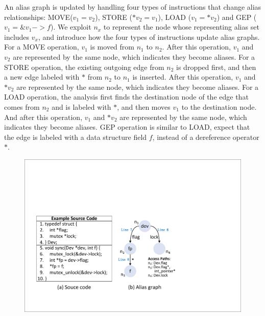 An alias graph is updated by handling four types of instructions that  
change alias relationships: MOVE($\mathit{v_1 = v_2}$), STORE ($\mathit{*v_2 = 
v_1}$), LOAD ($\mathit{v_1 = *v_2}$) and GEP ({$\mathit{v_1 = \&v_1->f}$}). We 
exploit {$\mathit{n_x}$} to represent the node whose representing alias set 
includes $\mathit{v_x}$, and introduce how the four types of instructions 
update alias graphs. For a MOVE operation, $\mathit{v_1}$ is moved from 
$\mathit{n_1}$ to $\mathit{n_2}$. After this operation, $\mathit{v_1}$ and  
$\mathit{v_2}$ are represented by the same node, which indicates they become 
aliases. For a STORE operation, the existing outgoing edge from $\mathit{n_2}$ 
is dropped first, and then a new edge labeled with $\mathit{*}$ from 
$\mathit{n_2}$ to $\mathit{n_1}$ is inserted. After this operation, 
$\mathit{v_1}$ and $\mathit{*v_2}$ are represented by the same node, which 
indicates they become aliases. For a LOAD operation, the analysis first finds 
the destination node of the edge that comes from $\mathit{n_2}$ and is labeled 
with $\mathit{*}$, and then moves $\mathit{v_1}$ to the destination node. And 
after this operation, $\mathit{v_1}$ and $\mathit{*v_2}$ are represented by the 
same node, which indicates they become aliases. GEP operation is similar to 
LOAD, expect that the edge is labeled with a data structure field $\mathit{f}$, 
instead of a dereference operator $\mathit{*}$.

\begin{figure}[htbp]
	\centering
	\includegraphics[width=0.9\linewidth]{figures/fig_demo_alias_graph.pdf}
	\label{fig_demo_alias_graph}
\end{figure}

